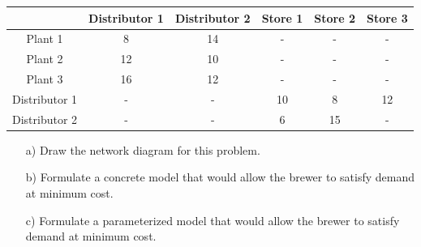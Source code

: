 \documentclass[11pt]{article}
\theoremstyle{definition}
\begin{document}
\begin{center}
\begin{tabular}{c|ccccc} \hline
& Distributor 1 & Distributor 2 & Store 1 & Store 2 & Store 3 \\ \hline
Plant 1 & 8 & 14 & - & - & - \\
Plant 2 & 12 & 10 & - & - & - \\
Plant 3 & 16 & 12 & - & - & - \\
Distributor 1 & - & - & 10 & 8 &  12 \\
Distributor 2 & - & - & 6 & 15 & - \\ \hline
\end{tabular}

\end{center}

\begin{enumerate}
\item[a)] Draw the network diagram for this problem.
\item[b)] Formulate a concrete model that would allow the brewer to satisfy demand at minimum cost.
\item[c)] Formulate a parameterized model that would allow the brewer to satisfy demand at minimum cost.
\end{enumerate}
\end{document}
